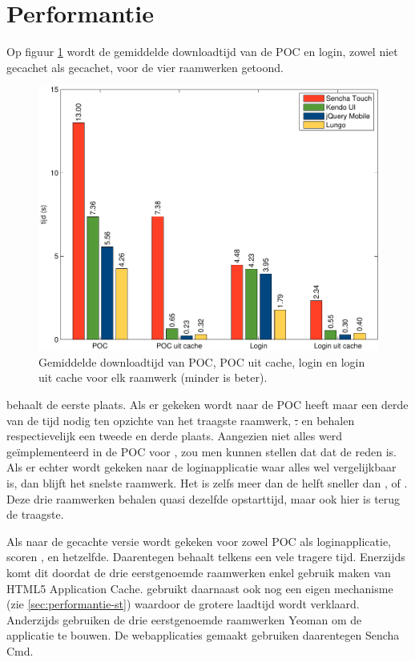 \section{Performantie}
\label{sec:evaluatie-performantie}


Op figuur \ref{fig:performantie} wordt de gemiddelde downloadtijd van de POC en login, zowel niet gecachet als gecachet, voor de vier raamwerken getoond.

\begin{figure}[H]
  \centering
  \includegraphics[width=\textwidth]{figuren/performance.pdf}
  \caption{Gemiddelde downloadtijd van POC,  POC uit cache,  login en login uit cache voor elk raamwerk (minder is beter).}
  \label{fig:performantie}
\end{figure}

\lungo{} behaalt de eerste plaats.
Als er gekeken wordt naar de POC heeft \lungo{} maar een derde van de tijd nodig ten opzichte van het traagste raamwerk, \st.
\jqm{} en \kendo{} behalen respectievelijk een tweede en derde plaats.
Aangezien niet alles werd geïmplementeerd in de POC voor \lungo{}, zou men kunnen stellen dat dat de reden is.
Als er echter wordt gekeken naar de loginapplicatie waar alles wel vergelijkbaar is, dan blijft \lungo{} het snelste raamwerk.
Het is zelfs meer dan de helft sneller dan \jqm{}, \kendo{} of \st{}.
Deze drie raamwerken behalen quasi dezelfde opstarttijd, maar ook hier is \st{} terug de traagste.

Als naar de gecachte versie wordt gekeken voor zowel POC als loginapplicatie, scoren \kendo{}, \jqm{} en \lungo{} hetzelfde.
Daarentegen behaalt \st{} telkens een vele tragere tijd.
Enerzijds komt dit doordat de drie eerstgenoemde raamwerken enkel gebruik maken van HTML5 Application Cache.
\st{} gebruikt daarnaast ook nog een eigen mechanisme (zie \ref{sec:performantie-st}) waardoor de grotere laadtijd wordt verklaard.
Anderzijds gebruiken de drie eerstgenoemde raamwerken Yeoman om de applicatie te bouwen.
De webapplicaties gemaakt \st{} gebruiken daarentegen Sencha Cmd.

